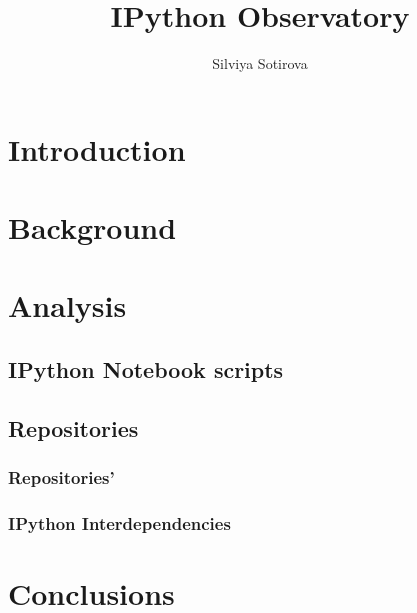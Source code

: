 \documentclass{mpaper}
\begin{document}
\title{IPython Observatory}
\author{Silviya Sotirova}

\maketitle

\begin{abstract}

\end{abstract}

\section{Introduction}


\section{Background}


\section{Analysis}
\subsection{IPython Notebook scripts}
\subsection{Repositories}
\subsubsection{Repositories' }
\subsubsection{IPython Interdependencies}



\section{Conclusions}





\end{document}
